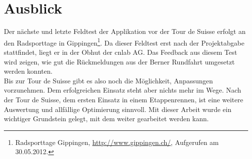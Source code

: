 \section{Ausblick}
Der nächste und letzte Feldtest der Applikation vor der Tour de Suisse erfolgt an den Radsporttage in Gippingen\footnote{Radsporttage Gippingen, \url{http://www.gippingen.ch/}, Aufgerufen am 30.05.2012.}. Da dieser Feldtest erst nach der Projektabgabe stattfindet, liegt er in der Obhut der cnlab AG. Das Feedback aus diesem Test wird zeigen, wie gut die Rückmeldungen aus der Berner Rundfahrt umgesetzt werden konnten.
\\
Bis zur Tour de Suisse gibt es also noch die Möglichkeit, Anpassungen vorzunehmen. Dem erfolgreichen Einsatz steht aber nichts mehr im Wege. Nach der Tour de Suisse, dem ersten Einsatz in einem Etappenrennen, ist eine weitere Auswertung und allfällige Optimierung sinnvoll. Mit dieser Arbeit wurde ein wichtiger Grundstein gelegt, mit dem weiter gearbeitet werden kann.